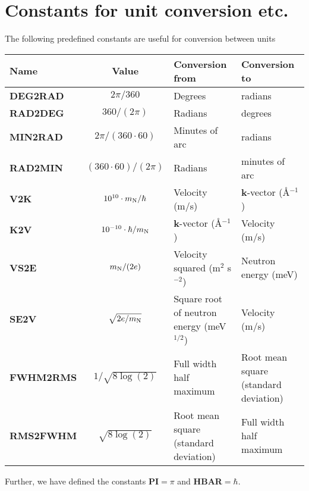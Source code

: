 \section{Constants for unit conversion etc.}
The following predefined constants are useful for conversion
between units
\def\textvb{\textbf}
\begin{center}
\begin{tabular}{|l|c|p{}|p{}|}
\hline
Name & Value & Conversion from & Conversion to \\ \hline
\textvb{DEG2RAD} & $2 \pi / 360$ & Degrees & radians \\
\textvb{RAD2DEG} & $360 / (2 \pi)$ & Radians & degrees \\
\textvb{MIN2RAD} & $2 \pi / (360 \cdot 60)$ 
  & Minutes of arc & radians \\
\textvb{RAD2MIN} & $(360\cdot 60) / (2 \pi)$ 
  & Radians & minutes of arc \\
\textvb{V2K} & $10^{10} \cdot m_{\rm N}/\hbar$ 
  & Velocity (m/s) & {\bf k}-vector (\AA$^{-1}$) \\ 
\textvb{K2V} & $10^{-10} \cdot \hbar / m_{\rm N}$ 
  & {\bf k}-vector (\AA$^{-1}$) & Velocity (m/s) \\
\textvb{VS2E} & $m_{\rm N} / (2 e)$
  & Velocity squared (m$^2$ s$^{-2}$) & Neutron energy (meV) \\
\textvb{SE2V} & $\sqrt{2 e/m_{\rm N}}$ 
  & Square root of neutron energy (meV$^{1/2}$) & Velocity (m/s) \\
\textvb{FWHM2RMS} & $1/\sqrt{8\log(2)}$ 
  & Full width half maximum & Root mean square (standard deviation) \\
\textvb{RMS2FWHM} & $\sqrt{8\log(2)}$ 
  & Root mean square (standard deviation) & Full width half maximum \\
\hline
\end{tabular}
\end{center}

Further, we have defined the constants \textvb{PI}$=\pi$ and \textvb{HBAR}$=\hbar$.
